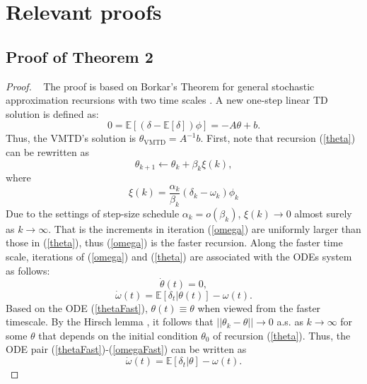 \onecolumn
\appendix
\section{Relevant proofs}
\subsection{Proof of Theorem 2}
\label{proofth1}
\begin{proof}
\label{th1proof}   
 The proof is based on Borkar's Theorem for
 general stochastic approximation recursions with two time scales \cite{borkar1997stochastic}. 
 A new one-step linear TD solution is defined as: 
\begin{equation*}
0=\mathbb{E}[(\delta-\mathbb{E}[\delta]) \phi]=-A\theta+b.
\end{equation*}
Thus, the VMTD's solution is $\theta_{\text{VMTD}}=A^{-1}b$. First, note that recursion (\ref{theta}) can be rewritten as
\begin{equation*}
\theta_{k+1}\leftarrow \theta_k+\beta_k\xi(k),
\end{equation*}
where
\begin{equation*}
\xi(k)=\frac{\alpha_k}{\beta_k}(\delta_k-\omega_k)\phi_k
\end{equation*}
Due to the settings of step-size schedule $\alpha_k = o(\beta_k)$,
$\xi(k)\rightarrow 0$ almost surely as $k\rightarrow\infty$. 
 That is the increments in iteration (\ref{omega}) are uniformly larger than
 those in (\ref{theta}), thus (\ref{omega}) is the faster recursion.
 Along the faster time scale, iterations of (\ref{omega}) and (\ref{theta})
 are associated with the ODEs system as follows:
\begin{equation}
 \dot{\theta}(t) = 0,
\label{thetaFast}
\end{equation}
\begin{equation}
 \dot{\omega}(t)=\mathbb{E}[\delta_t|\theta(t)]-\omega(t).
\label{omegaFast}
\end{equation}
 Based on the ODE (\ref{thetaFast}), $\theta(t)\equiv \theta$ when
 viewed from the faster timescale. 
 By the Hirsch lemma \cite{hirsch1989convergent}, it follows that
$||\theta_k-\theta||\rightarrow 0$ a.s. as $k\rightarrow \infty$ for some
$\theta$ that depends on the initial condition $\theta_0$ of recursion
 (\ref{theta}).
 Thus, the ODE pair (\ref{thetaFast})-(\ref{omegaFast}) can be written as
\begin{equation}
 \dot{\omega}(t)=\mathbb{E}[\delta_t|\theta]-\omega(t).
\label{omegaFastFinal}
\end{equation}

\end{proof}
